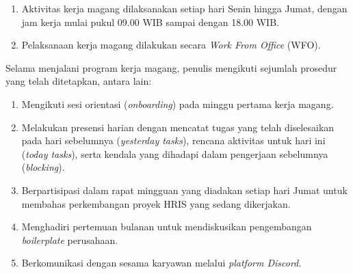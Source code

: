 \begin{enumerate}
    \item Aktivitas kerja magang dilaksanakan setiap hari Senin hingga Jumat, 
    dengan jam kerja mulai pukul 09.00 WIB sampai dengan 18.00 WIB.
    \item Pelaksanaan kerja magang dilakukan secara \textit{Work From Office} (WFO).
\end{enumerate}

Selama menjalani program kerja magang, penulis mengikuti sejumlah prosedur 
yang telah ditetapkan, antara lain:

\begin{enumerate}
    \item Mengikuti sesi orientasi (\textit{onboarding}) pada minggu pertama kerja magang.
    \item Melakukan presensi harian dengan mencatat tugas yang telah diselesaikan 
    pada hari sebelumnya (\textit{yesterday tasks}), rencana aktivitas untuk hari ini 
    (\textit{today tasks}), serta kendala yang dihadapi dalam pengerjaan sebelumnya (\textit{blocking}).
    \item Berpartisipasi dalam rapat mingguan yang diadakan setiap hari Jumat 
    untuk membahas perkembangan proyek HRIS yang sedang dikerjakan.
    \item Menghadiri pertemuan bulanan untuk mendiskusikan pengembangan 
    \textit{boilerplate} perusahaan.
    \item Berkomunikasi dengan sesama karyawan melalui \textit{platform Discord}.
\end{enumerate}
